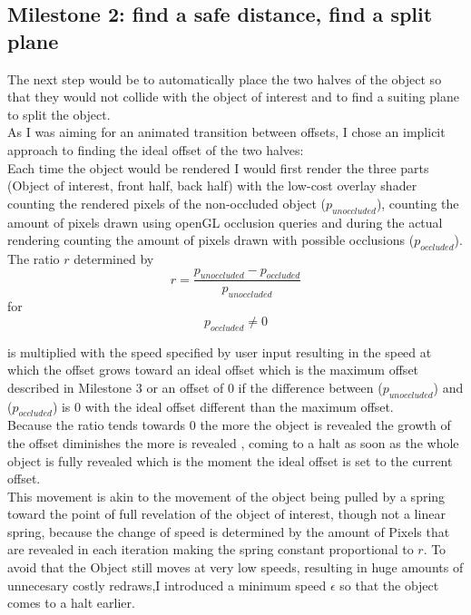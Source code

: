 \subsection{Milestone 2: find a safe distance, find a split plane} 
The next step would be to automatically place the two halves of the object so that they would not collide with the object of interest and to find a suiting plane to split the object.\\
As I was aiming for an animated transition between offsets, I chose an implicit approach to finding the ideal offset of the two halves:\\
Each time the object would be rendered I would first render the three parts (Object of interest, front half, back half) with the low-cost overlay shader counting the rendered pixels of the non-occluded object ($p_{unoccluded}$), counting the amount of pixels drawn using openGL occlusion queries and during the actual rendering counting the amount of pixels drawn with possible occlusions ($p_{occluded}$). The ratio $r$ determined by
\begin{equation}\label{eq:Occlusion ratio}
	r =\frac{p_{unoccluded} - p_{occluded}}{ p_{unoccluded}}
\end{equation}
for
\begin{equation}
	p_{occluded} \neq 0
\end{equation}

is multiplied with the speed specified by user input resulting in the speed at which the offset grows toward an ideal offset which is the maximum offset described in Milestone 3 or an offset of 0 if the difference between  ($p_{unoccluded}$) and  ($p_{occluded}$) is 0 with the ideal offset different than the maximum offset.\\
Because the ratio tends towards 0 the more the object is revealed the growth of the offset diminishes the more is revealed , coming to a halt as soon as the whole object is fully revealed which is the moment the ideal offset is set to the current offset.\\
This movement is akin to the movement of the object being pulled by a spring toward the point of full revelation of the object of interest, though not a linear spring, because the change of speed is determined by the amount of Pixels that are revealed in each iteration making the spring constant proportional to $r$.
To avoid that the Object still moves at very low speeds, resulting in huge amounts of unnecesary costly redraws,I introduced a  minimum speed $\epsilon$ so that the object comes to a halt earlier.\\

